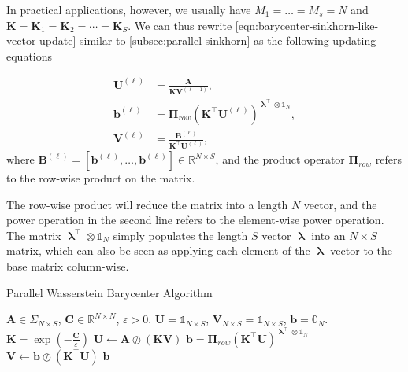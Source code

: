 In practical applications, however,
we usually have $M_1 = \ldots = M_s = N$
and $\mathbf{K} = \mathbf{K}_1 = \mathbf{K}_2 = \cdots = \mathbf{K}_S$.
We can thus rewrite \cref{eqn:barycenter-sinkhorn-like-vector-update}
similar to \cref{subsec:parallel-sinkhorn} as the following updating equations

\begin{update}\label{update:parallel-barycenter}
  \begin{equation}\label{eqn:barycenter-sinkhorn-like-matrix-update}
    \begin{aligned}
      \mathbf{U}^{(\ell)}
       & = \frac{\mathbf{A}}{\mathbf{K} \mathbf{V}^{(\ell-1)}},                                          \\
      \mathbf{b}^{(\ell)}
       & = \boldsymbol{\Pi}_{row}
      \left(\mathbf{K}^\top \mathbf{U}^{(\ell)}\right)^{\boldsymbol\uplambda^\top \otimes \mathbb{1}_N}, \\
      \mathbf{V}^{(\ell)}
       & = \frac{\mathbf{B}^{(\ell)}}{\mathbf{K}^\top \mathbf{U}^{(\ell)}},
    \end{aligned}
  \end{equation}
  where $\mathbf{B}^{(\ell)} = \left[\mathbf{b}^{(\ell)}, \ldots, \mathbf{b}^{(\ell)}\right] \in \mathbb{R}^{N\times S}$,
  and the product operator $\boldsymbol\Pi_{row}$ refers to the row-wise product on the matrix.
\end{update}

The row-wise product will reduce the matrix into a length $N$ vector,
and the power operation in the second line refers to the element-wise power operation.
The matrix $\boldsymbol\uplambda^\top \otimes \mathbb{1}_N$ simply populates the length $S$ vector
$\boldsymbol\uplambda$ into an $N\times S$ matrix,
which can also be seen as applying each element of the $\boldsymbol\uplambda$ vector to the base matrix column-wise.



\begin{algorithm}[H]
  \caption{Parallel Wasserstein Barycenter Algorithm}
  \begin{algorithmic}[1]\label{algo:parallel-barycenter}
    \Require $\mathbf{A} \in \Sigma_{N \times S}$, $\mathbf{C} \in \mathbb{R}^{N \times N}$, $\varepsilon > 0$.
    \Initialize $\mathbf{U} = \mathbb{1}_{N \times S}$, $\mathbf{V}_{N \times S} = \mathbb{1}_{N \times S}$,
    $\mathbf{b} = \mathbb{0}_N$.
    \State $\mathbf{K} = \exp(-\frac{\mathbf{C}}{\varepsilon})$
    \State $\mathbf{U} \leftarrow \mathbf{A} \oslash (\mathbf{K} \mathbf{V})$
    \State $\mathbf{b} =
      \boldsymbol\Pi_{row}
      \left(\mathbf{K}^\top \mathbf{U}\right)^{\boldsymbol\uplambda^\top \otimes \mathbb{1}_N}
    $
    \State $\mathbf{V} \leftarrow \mathbf{b} \oslash (\mathbf{K}^\top \mathbf{U})$
    \EndWhile
    \Ensure $\mathbf{b}$
  \end{algorithmic}
\end{algorithm}

